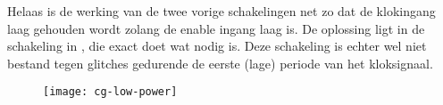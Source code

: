 Helaas is de werking van de twee vorige schakelingen net zo dat de klokingang laag gehouden wordt zolang de enable ingang laag is. De oplossing ligt in de schakeling in , die exact doet wat nodig is. Deze schakeling is echter wel niet bestand tegen glitches gedurende de eerste (lage) periode van het kloksignaal.

\begin{figure}[h]
	\centering
		\texttt{[image: cg-low-power]}
\end{figure}
